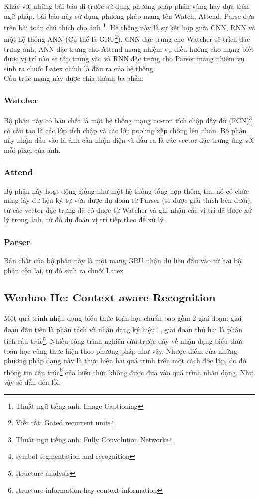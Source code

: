 \documentclass[a4paper,12pt]{article}
\begin{document}
	Khác với những bài báo đi trước sử dụng phương pháp phân vùng hay dựa trên ngữ pháp, bài báo này sử dụng phương pháp mang tên Watch, Attend, Parse dựa trên bài toán chú thích cho ảnh \footnote{Thuật ngữ tiếng anh: Image Captioning}. Hệ thống này là sự kết hợp giữa CNN, RNN và một hệ thống ANN (Cụ thể là GRU\footnote{Viết tắt: Gated recurrent unit}), CNN đặc trưng cho Watcher sẽ trích đặc trưng ảnh, ANN đặc trưng cho Attend mang nhiệm vụ điều hướng cho mạng biết được vị trí nào sẽ tập trung vào và RNN đặc trưng cho Parser mang nhiệm vụ sinh ra chuỗi Latex chính là đầu ra của hệ thống\\
	
	Cấu trúc mạng này được chia thành ba phần:
	\subsubsection{Watcher}
	Bộ phận này có bản chất là một hệ thống mạng nơ-ron tích chập đầy đủ (FCN)\footnote{Thuật ngữ tiếng anh: Fully Convolution Network} có cấu tạo là các lớp tích chập và các lớp pooling xếp chồng lên nhau. Bộ phận này nhận đầu vào là ảnh cần nhận diện và đầu ra là các vector đặc trưng ứng với mỗi pixel của ảnh.
	
	\subsubsection{Attend}
	Bộ phận này hoạt động giống như một hệ thống tổng hợp thông tin, nó có chức năng lấy dữ liệu ký tự vừa được dự đoán từ Parser (sẽ được giải thích bên dưới), từ các vector đặc trưng đã có được từ Watcher và ghi nhận các vị trí đã được xử lý trong ảnh, từ đó dự đoán vị trí tiếp theo để xử lý.
	
	\subsubsection{Parser}
	Bản chất của bộ phận này là một mạng GRU nhận dữ liệu đầu vào từ hai bộ phận còn lại, từ đó sinh ra chuỗi Latex
	
	\subsection{Wenhao He\cite{context}: Context-aware Recognition}
	\label{subsec: context}
	Một quá trình nhận dạng biểu thức toán học chuẩn bao gồm 2 giai đoạn: giai đoạn đầu tiên là phân tách và nhận dạng ký hiệu\footnote{symbol segmentation and recognition} , giai đoạn thứ hai là phân tích cấu trúc\footnote{structure analysis}. Nhiều công trình nghiên cứu trước đây về nhận dạng biểu thức toán học cũng thực hiện theo phương pháp như vậy. Nhược điểm của những phương pháp dạng này là thực hiện hai quá trình trên một cách độc lập, do đó thông tin cấu trúc\footnote{structure information hay context information} của biểu thức không được đưa vào quá trình nhận dạng. Như vậy sẽ dẫn đến lỗi\cite{context}.
	
\end{document}
